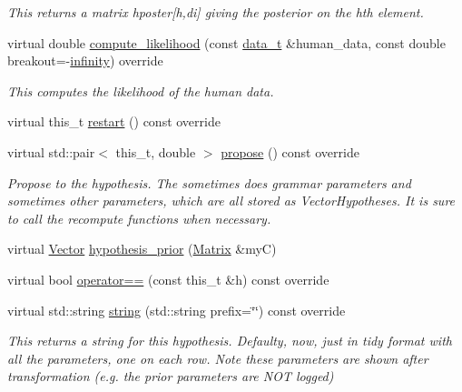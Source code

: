\begin{DoxyCompactItemize}
\begin{DoxyCompactList}\small\item\em This returns a matrix hposter\mbox{[}h,di\mbox{]} giving the posterior on the h\textquotesingle{}th element. \end{DoxyCompactList}\item 
virtual double \hyperlink{class_grammar_hypothesis_a769eea50d9e40668022b120b6fddfe06}{compute\+\_\+likelihood} (const \hyperlink{class_bayesable_aa2788c4d7718c0a824e1d28c4c98f921}{data\+\_\+t} \&human\+\_\+data, const double breakout=-\/\hyperlink{_numerics_8h_af9434aea82baf2f6a5d9b6f9e36db08e}{infinity}) override
\begin{DoxyCompactList}\small\item\em This computes the likelihood of the {\itshape human data}. \end{DoxyCompactList}\item 
virtual this\+\_\+t \hyperlink{class_grammar_hypothesis_a85c5aad5990900d4da6eca5a24deb3e6}{restart} () const override
\item 
virtual std\+::pair$<$ this\+\_\+t, double $>$ \hyperlink{class_grammar_hypothesis_a8e6d781ab5fa0a6656b09b607a906735}{propose} () const override
\begin{DoxyCompactList}\small\item\em Propose to the hypothesis. The sometimes does grammar parameters and sometimes other parameters, which are all stored as Vector\+Hypotheses. It is sure to call the recompute functions when necessary. \end{DoxyCompactList}\item 
virtual \hyperlink{_eigen_lib_8h_aca2956bc379bce2ed88ab3c0e1b61d1d}{Vector} \hyperlink{class_grammar_hypothesis_a3fb4235ab47fe78e77c63023c22659d7}{hypothesis\+\_\+prior} (\hyperlink{_eigen_lib_8h_a645222978e81acfb2523a9bce34aecc0}{Matrix} \&myC)
\item 
virtual bool \hyperlink{class_grammar_hypothesis_a5af8ece466cdc1d0fc2a960ae1d63462}{operator==} (const this\+\_\+t \&h) const override
\item 
virtual std\+::string \hyperlink{class_grammar_hypothesis_a4f978eb7e5b7e5dc86f8a434297f8c8e}{string} (std\+::string prefix=\char`\"{}\char`\"{}) const override
\begin{DoxyCompactList}\small\item\em This returns a string for this hypothesis. Defaulty, now, just in tidy format with all the parameters, one on each row. Note these parameters are shown after transformation (e.\+g. the prior parameters are N\+OT logged) \end{DoxyCompactList}\item 

\end{DoxyCompactItemize}
